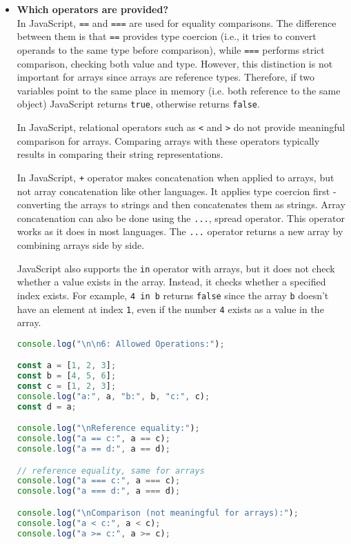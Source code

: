\documentclass{article}
\begin{document}
\begin{itemize}
\item \textbf{Which operators are provided?} \\
In JavaScript, \texttt{==} and \texttt{===} are used for equality comparisons. The difference between them is that \texttt{==} provides type coercion (i.e., it tries to convert operands to the same type before comparison), while \texttt{===} performs strict comparison, checking both value and type. However, this distinction is not important for arrays since arrays are reference types. Therefore, if two variables point to the same place in memory (i.e. both reference to the same object) JavaScript returns \texttt{true}, otherwise returns \texttt{false}.

In JavaScript, relational operators such as \texttt{<} and \texttt{>} do not provide meaningful comparison for arrays. Comparing arrays with these operators typically results in comparing their string representations. 

In JavaScript, \texttt{+} operator makes concatenation when applied to arrays, but not array concatenation like other languages. It applies type coercion first \mbox{-} converting the arrays to strings and then concatenates them as strings. Array concatenation can also be done using the \texttt{...}, spread operator. This operator works as it does in most languages. The \texttt{...} operator returns a new array by combining arrays side by side.

JavaScript also supports the \texttt{in} operator with arrays, but it does not check whether a value exists in the array. Instead, it checks whether a specified index exists. For example, \texttt{4 in b} returns \texttt{false} since the array \texttt{b} doesn't have an element at index \texttt{1}, even if the number \texttt{4} exists as a value in the array. 
\vspace{2pt}

\begin{lstlisting}[language=JavaScript]
console.log("\n\n6: Allowed Operations:");

const a = [1, 2, 3];
const b = [4, 5, 6];
const c = [1, 2, 3];
console.log("a:", a, "b:", b, "c:", c);
const d = a;

console.log("\nReference equality:");
console.log("a == c:", a == c); 
console.log("a == d:", a == d);  

// reference equality, same for arrays
console.log("a === c:", a === c); 
console.log("a === d:", a === d);   

console.log("\nComparison (not meaningful for arrays):");
console.log("a < c:", a < c); 
console.log("a >= c:", a >= c); 


\end{lstlisting}
\end{itemize}
\end{document}
